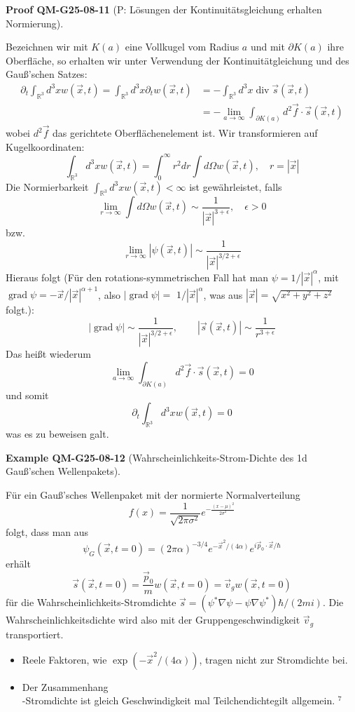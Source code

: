 \documentclass[10pt, letterpaper]{article}
\newcommand{\CustomHeading}[3]{%
  \par\medskip\noindent%
  \textbf{#1 #2} \textnormal{(#3)}.\enskip%
}
\newenvironment{EXA}[2]{\CustomHeading{Example}{#1}{#2}}{}
\newenvironment{PROOF}[2]{\CustomHeading{Proof}{#1}{#2}}{}
\begin{document}
\begin{PROOF}{QM-G25-08-11}{P: Lösungen der Kontinuitätsgleichung erhalten Normierung}
Bezeichnen wir mit $K(a)$ eine Vollkugel vom Radius $a$ und mit $\partial K(a)$ ihre Oberfläche, so erhalten wir unter Verwendung der Kontinuitätgleichung und des Gauß'schen Satzes: 
$$
\begin{aligned}
\partial_{t} \int_{\mathbb{R}^{3}} d^{3} x w(\vec{x}, t)=\int_{\mathbb{R}^{3}} d^{3} x \partial_{t} w(\vec{x}, t) & =-\int_{\mathbb{R}^{3}} d^{3} x \operatorname{div} \vec{s}(\vec{x}, t) \\
& =-\lim _{a \rightarrow \infty} \int_{\partial K(a)} d^{2} \vec{f} \cdot \vec{s}(\vec{x}, t)
\end{aligned}
$$
wobei $d^{2} \vec{f}$ das gerichtete Oberflächenelement ist. Wir transformieren auf Kugelkoordinaten:
$$
\int_{\mathbb{R}^{3}} d^{3} x w(\vec{x}, t)=\int_{0}^{\infty} r^{2} d r \int d \Omega w(\vec{x}, t), \quad r=|\vec{x}|
$$
Die Normierbarkeit $\int_{\mathbb{R}^{3}} d^{3} x w(\vec{x}, t)<\infty$ ist gewährleistet, falls
$$
\lim _{r \rightarrow \infty} \int d \Omega w(\vec{x}, t) \sim \frac{1}{|\vec{x}|^{3+\epsilon}}, \quad \epsilon>0
$$
bzw.
$$
\lim _{r \rightarrow \infty}|\psi(\vec{x}, t)| \sim \frac{1}{|\vec{x}|^{3 / 2+\epsilon}}
$$
Hieraus folgt (Für den rotations-symmetrischen Fall hat man $\psi=1 /|\vec{x}|^\alpha$, mit $\operatorname{grad} \psi=-\vec{x} /|\vec{x}|^{\alpha+1}$, also $|\operatorname{grad} \psi|=$ $1 /|\vec{x}|^\alpha$, was aus $|\vec{x}|=\sqrt{x^2+y^2+z^2}$ folgt.):
$$
|\operatorname{grad} \psi| \sim \frac{1}{|\vec{x}|^{3 / 2+\epsilon}}, \quad \quad|\vec{s}(\vec{x}, t)| \sim \frac{1}{r^{3+\epsilon}}
$$
Das heißt wiederum
$$
\lim _{a \rightarrow \infty} \int_{\partial K(a)} d^{2} \vec{f} \cdot \vec{s}(\vec{x}, t)=0
$$
und somit
$$
\partial_{t} \int_{\mathbb{R}^{3}} d^{3} x w(\vec{x}, t)=0
$$
was es zu beweisen galt.
\end{PROOF}

\begin{EXA}{QM-G25-08-12}{Wahrscheinlichkeits-Strom-Dichte des 1d Gauß'schen Wellenpakets}
Für ein Gauß'sches Wellenpaket mit der normierte Normalverteilung
$$f(x)=\frac{1}{\sqrt{2 \pi \sigma^{2}}} e^{-\frac{(x-\mu)^{2}}{2 \sigma^{2}}}$$
folgt, dass man aus
$$
\psi_{G}(\vec{x}, t=0)=(2 \pi \alpha)^{-3 / 4} e^{-\vec{x}^{2} /(4 \alpha)} e^{i \vec{p}_{0} \cdot \vec{x} / \hbar}
$$
erhält
$$
\vec{s}(\vec{x}, t=0)=\frac{\vec{p}_{0}}{m} w(\vec{x}, t=0)=\vec{v}_{g} w(\vec{x}, t=0)
$$
für die Wahrscheinlichkeits-Stromdichte $\vec{s}=\left(\psi^{*} \nabla \psi-\psi \nabla \psi^{*}\right) \hbar /(2 m i)$. Die Wahrscheinlichkeitsdichte wird also mit der Gruppengeschwindigkeit $\vec{v}_{g}$ transportiert.

\begin{itemize}
  \item Reele Faktoren, wie $\exp \left(-\vec{x}^{2} /(4 \alpha)\right)$, tragen nicht zur Stromdichte bei.
  \item Der Zusammenhang\\
-Stromdichte ist gleich Geschwindigkeit mal Teilchendichtegilt allgemein. ${ }^{7}$
\end{itemize}
\end{EXA}
\end{document}
